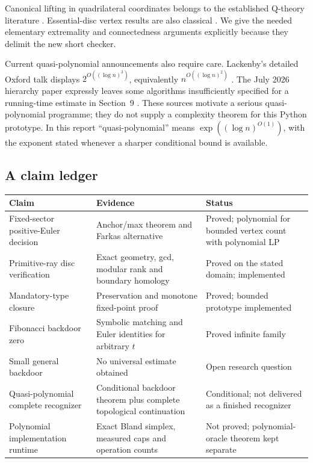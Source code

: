 Canonical lifting in quadrilateral coordinates belongs to the established Q-theory literature \cite{Tollefson,BurtonQ}. Essential-disc vertex results are also classical \cite{HLP,Suh}. We give the needed elementary extremality and connectedness arguments explicitly because they delimit the new short checker.

Current quasi-polynomial announcements also require care. Lackenby's detailed Oxford talk displays $2^{O((\log n)^3)}$, equivalently $n^{O((\log n)^2)}$ \cite{LackenbyTalk}. The July 2026 hierarchy paper expressly leaves some algorithms insufficiently specified for a running-time estimate in Section~9 \cite{Lackenby2026}. These sources motivate a serious quasi-polynomial programme; they do not supply a complexity theorem for this Python prototype. In this report ``quasi-polynomial'' means $\exp((\log n)^{O(1)})$, with the exponent stated whenever a sharper conditional bound is available.

\subsection{A claim ledger}

\begin{center}\small
\begin{tabularx}{\textwidth}{@{}>{\raggedright\arraybackslash}p{}>{\raggedright\arraybackslash}X>{\raggedright\arraybackslash}p{}@{}}
\toprule
Claim & Evidence & Status\\
\midrule
Fixed-sector positive-Euler decision & Anchor/max theorem and Farkas alternative & Proved; polynomial for bounded vertex count with polynomial LP\\
Primitive-ray disc verification & Exact geometry, gcd, modular rank and boundary homology & Proved on the stated domain; implemented\\
Mandatory-type closure & Preservation and monotone fixed-point proof & Proved; bounded prototype implemented\\
Fibonacci backdoor zero & Symbolic matching and Euler identities for arbitrary $t$ & Proved infinite family\\
Small general backdoor & No universal estimate obtained & Open research question\\
Quasi-polynomial complete recognizer & Conditional backdoor theorem plus complete topological continuation & Conditional; not delivered as a finished recognizer\\
Polynomial implementation runtime & Exact Bland simplex, measured caps and operation counts & Not proved; polynomial-oracle theorem kept separate\\
\bottomrule
\end{tabularx}
\end{center}
